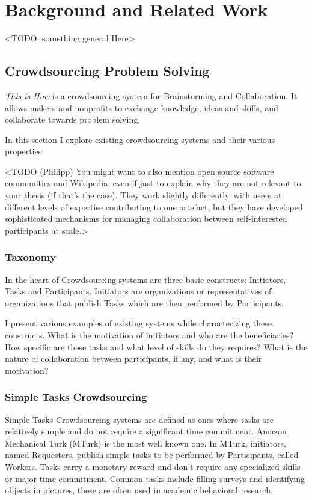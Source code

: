 \chapter{Background and Related Work}
\label{chap_background}
<TODO: something general Here>

\section{Crowdsourcing Problem Solving}

\textit{This is How} is a crowdsourcing system for Brainstorming and Collaboration. It allows makers and nonprofits to exchange knowledge, ideas and skills, and collaborate towards problem solving.

In this section I explore existing crowdsourcing systems and their various properties.

<TODO (Philipp) You might want to also mention open source software communities and Wikipedia, even if just to explain why they are not relevant to your thesis (if that’s the case). They work slightly differently, with users at different levels of expertise contributing to one artefact, but they have developed sophisticated mechanisms for managing collaboration between self-interested participants at scale.>

\subsection{Taxonomy} 

In the heart of Crowdsourcing systems are three basic constructs: Initiators, Tasks and Participants. Initiators are organizations or representatives of organizations that publish Tasks which are then performed by Participants. 

I present various examples of existing systems while characterizing these constructs. What is the motivation of initiators and who are the beneficiaries? How specific are these tasks and what level of skills do they requires? What is the nature of collaboration between participants, if any, and what is their motivation?

\subsection{Simple Tasks Crowdsourcing}

Simple Tasks Crowdsourcing systems are defined as ones where tasks are relatively simple and do not require a significant time commitment. Amazon Mechanical Turk (MTurk) \cite{mturk} is the most well known one. In MTurk, initiators, named Requesters, publish simple tasks to be performed by Participants, called Workers. Tasks carry a monetary reward and don't require any specialized skills or major time commitment. Common tasks include filling surveys and  identifying objects in pictures, these are often used in academic behavioral research.  

